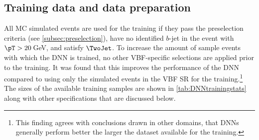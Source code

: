 \subsection{Training data and data preparation}
\label{subsec:training-data}
All MC simulated events are used for the training if they pass the preselection criteria (see \cref{subsec:preselection}), have no identified $b$-jet in the event with $\pT > 20\,$GeV, and satisfy $\TwoJet$. To increase the amount of sample events with which the DNN is trained, no other VBF-specific selections are applied prior to the training. 
It was found that this improves the performance of the DNN compared to using only the simulated events in the VBF SR for the training.\footnote{This finding agrees with conclusions drawn in other domains, that DNNs generally perform better the larger the dataset available for the training.}
The sizes of the available training samples are shown in \cref{tab:DNNtrainingstats} along with other specifications that are discussed below.
\FloatBarrier
